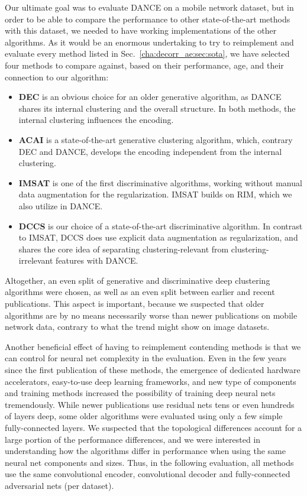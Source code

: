 			Our ultimate goal was to evaluate \ac{DANCE} on a mobile network dataset, but in order to be able to compare the performance to other state-of-the-art methods with this dataset, we needed to have working implementations of the other algorithms.
			As it would be an enormous undertaking to try to reimplement and evaluate every method listed in Sec.~\ref{cha:decorr_ae:sec:sota}, we have selected four methods to compare against, based on their performance, age, and their connection to our algorithm:
			\begin{itemize}
				\item \textbf{\ac{DEC}} is an obvious choice for an older generative algorithm, as \ac{DANCE} shares its internal clustering and the overall structure.
				In both methods, the internal clustering influences the encoding.
				\item \textbf{\ac{ACAI}} is a state-of-the-art generative clustering algorithm, which, contrary \ac{DEC} and \ac{DANCE}, develops the encoding independent from the internal clustering.
				\item \textbf{\ac{IMSAT}} is one of the first discriminative algorithms, working without manual data augmentation for the regularization. \ac{IMSAT} builds on \ac{RIM}, which we also utilize in \ac{DANCE}.
				\item \textbf{\ac{DCCS}} is our choice of a state-of-the-art discriminative algorithm.
				In contrast to \ac{IMSAT}, \ac{DCCS} does use explicit data augmentation as regularization, and shares the core idea of separating clustering-relevant from clustering-irrelevant features with \ac{DANCE}.
			\end{itemize}
			\noindent Altogether, an even split of generative and discriminative deep clustering algorithms were chosen, as well as an even split between earlier and recent publications.
			This aspect is important, because we suspected that older algorithms are by no means necessarily worse than newer publications on mobile network data, contrary to what the trend might show on image datasets.
			
			Another beneficial effect of having to reimplement contending methods is that we can control for neural net complexity in the evaluation.
			Even in the few years since the first publication of these methods, the emergence of dedicated hardware accelerators, easy-to-use deep learning frameworks, and new type of components and training methods increased the possibility of training deep neural nets tremendously.
			While newer publications use residual nets tens or even hundreds of layers deep, some older algorithms were evaluated using only a few simple fully-connected layers.
			We suspected that the topological differences account for a large portion of the performance differences, and we were interested in understanding how the algorithms differ in performance when using the same neural net components and sizes.
			Thus, in the following evaluation, all methods use the same convolutional encoder, convolutional decoder and fully-connected adversarial nets (per dataset).
			
